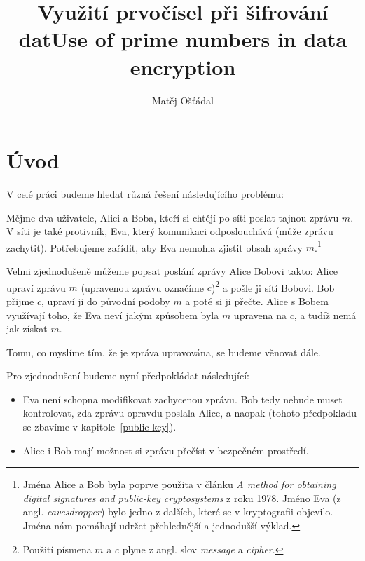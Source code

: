 \documentclass[
  program=infoi,
  biblatex,
  figures=false,
  glossaries,
  index
]{kidiplom}
\title{Využití prvočísel při šifrování dat}
\title[english]{Use of prime numbers in data encryption}
\author{Matěj Ošťádal}
\begin{document}
\maketitle



\newcommand{\BibLaTeX}{\textsc{Bib}\LaTeX}

\part{Úvod}\label{introduction}



    V celé práci budeme hledat různá řešení následujícího problému:

    \medskip
    Mějme dva uživatele, Alici a Boba, kteří si chtějí po síti poslat tajnou zprávu $m$.
    V síti je také protivník, Eva, který komunikaci odposlouchává (může zprávu zachytit). Potřebujeme zařídit, aby Eva
    nemohla zjistit obsah zprávy $m$.\footnote{Jména Alice a Bob byla poprve použita v článku 
    \emph{A method for obtaining digital signatures and public-key cryptosystems} z roku 1978.
    Jméno Eva (z angl. \emph{eavesdropper}) bylo jedno z dalších, které se v kryptografii objevilo.
    Jména nám pomáhají udržet přehlednější a jednodušší výklad.}

    Velmi zjednodušeně můžeme popsat poslání zprávy Alice Bobovi takto:
    Alice upraví zprávu $m$ (upravenou zprávu označíme $c$)\footnote{Použití písmena $m$ a $c$ plyne z angl. slov \emph{message} a \emph{cipher}.}
    a pošle ji sítí Bobovi.
    Bob přijme $c$, upraví ji do původní podoby $m$ a poté si ji přečte.
    Alice s Bobem využívají toho, že Eva neví jakým způsobem byla $m$ upravena na $c$, a tudíž nemá jak získat $m$.

    \medskip

    Tomu, co myslíme tím, že je zpráva upravována, se budeme věnovat dále.

    \bigskip

    Pro zjednodušení budeme nyní předpokládat následující:

    \begin{itemize}
        \item
            Eva není schopna modifikovat zachycenou zprávu.
            Bob tedy nebude muset kontrolovat, zda zprávu opravdu poslala Alice, a naopak
            (tohoto předpokladu se zbavíme v kapitole~\ref{public-key}).
        \item
            Alice i Bob mají možnost si zprávu přečíst v bezpečném prostředí.
    \end{itemize}
\end{document}

